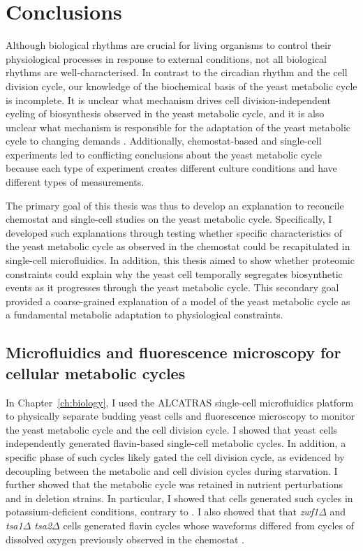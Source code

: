 \chapter{Conclusions}
\label{ch:concl}

Although biological rhythms are crucial for living organisms to control their physiological processes in response to external conditions, not all biological rhythms are well-characterised.
In contrast to the circadian rhythm and the cell division cycle, our knowledge of the biochemical basis of the yeast metabolic cycle is incomplete.
It is unclear what mechanism drives cell division-independent cycling of biosynthesis observed in the yeast metabolic cycle, and it is also unclear what mechanism is responsible for the adaptation of the yeast metabolic cycle to changing demands \parencite{zylstraMetabolicDynamicsCell2022}.
Additionally, chemostat-based and single-cell experiments led to conflicting conclusions about the yeast metabolic cycle because each type of experiment creates different culture conditions and have different types of measurements.

The primary goal of this thesis was thus to develop an explanation to reconcile chemostat and single-cell studies on the yeast metabolic cycle.
Specifically, I developed such explanations through testing whether specific characteristics of the yeast metabolic cycle as observed in the chemostat could be recapitulated in single-cell microfluidics.
In addition, this thesis aimed to show whether proteomic constraints could explain why the yeast cell temporally segregates biosynthetic events as it progresses through the yeast metabolic cycle.
This secondary goal provided a coarse-grained explanation of a model of the yeast metabolic cycle as a fundamental metabolic adaptation to physiological constraints.


\section{Microfluidics and fluorescence microscopy for cellular metabolic cycles}
\label{sec:concl-biology}

In Chapter~\ref{ch:biology}, I used the ALCATRAS \parencite{craneMicrofluidicSystemStudying2014} single-cell microfluidics platform to physically separate budding yeast cells and fluorescence microscopy to monitor the yeast metabolic cycle and the cell division cycle.
I showed that yeast cells independently generated flavin-based single-cell metabolic cycles.
In addition, a specific phase of such cycles likely gated the cell division cycle, as evidenced by decoupling between the metabolic and cell division cycles during starvation.
I further showed that the metabolic cycle was retained in nutrient perturbations and in deletion strains.
In particular, I showed that cells generated such cycles in potassium-deficient conditions, contrary to \textcite{oneillEukaryoticCellBiology2020}.
I also showed that that \textit{zwf1$\Delta$} and \textit{tsa1$\Delta$ tsa2$\Delta$} cells generated flavin cycles whose waveforms differed from cycles of dissolved oxygen previously observed in the chemostat \parencite{tuCyclicChangesMetabolic2007,caustonMetabolicCyclesYeast2015}.

